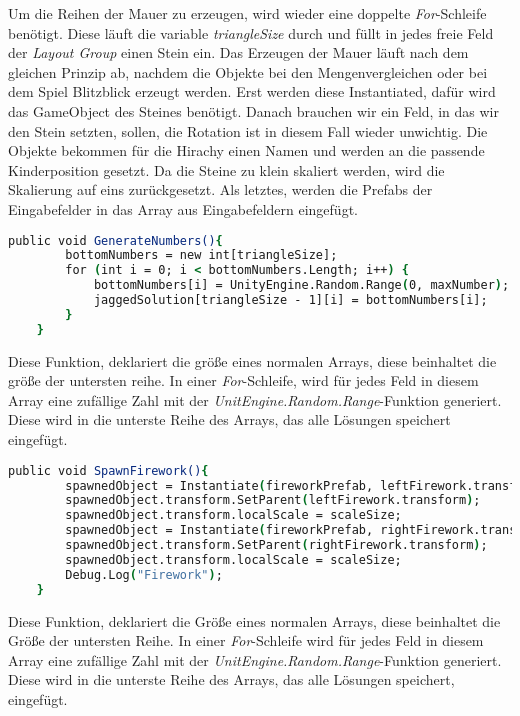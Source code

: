 Um die Reihen der Mauer zu erzeugen, wird wieder eine doppelte \textit{For}-Schleife benötigt. Diese läuft die variable \textit{triangleSize} durch und füllt in jedes freie Feld der \textit{Layout Group} einen Stein ein. Das Erzeugen der Mauer läuft nach dem gleichen Prinzip ab, nachdem die Objekte bei den Mengenvergleichen oder bei dem Spiel Blitzblick erzeugt werden. Erst werden diese Instantiated, dafür wird das GameObject des Steines benötigt. Danach brauchen wir ein Feld, in das wir den Stein setzten, sollen, die Rotation ist in diesem Fall wieder unwichtig. Die Objekte bekommen für die Hirachy einen Namen und werden an die passende Kinderposition gesetzt. Da die Steine zu klein skaliert werden, wird die Skalierung auf eins zurückgesetzt. Als letztes, werden die Prefabs der Eingabefelder in das Array aus Eingabefeldern eingefügt.\\
\begin{lstlisting}[language=csh, caption={Triangle.cs GenerateNumbers-Funktion}]
	public void GenerateNumbers(){
		bottomNumbers = new int[triangleSize];
		for (int i = 0; i < bottomNumbers.Length; i++) {
			bottomNumbers[i] = UnityEngine.Random.Range(0, maxNumber);
			jaggedSolution[triangleSize - 1][i] = bottomNumbers[i];
		}
	}
\end{lstlisting}
Diese Funktion, deklariert die größe eines normalen Arrays, diese beinhaltet die größe der untersten reihe. In einer \textit{For}-Schleife, wird für jedes Feld in diesem Array eine zufällige Zahl mit der \textit{UnitEngine.Random.Range}-Funktion generiert. Diese wird in die unterste Reihe des Arrays, das alle Lösungen speichert eingefügt.\\
\begin{lstlisting}[language=csh, caption={Triangle.cs SpawnFirework-Funktion}]
	public void SpawnFirework(){
		spawnedObject = Instantiate(fireworkPrefab, leftFirework.transform.position, leftFirework.transform.rotation);
		spawnedObject.transform.SetParent(leftFirework.transform);
		spawnedObject.transform.localScale = scaleSize;
		spawnedObject = Instantiate(fireworkPrefab, rightFirework.transform.position, rightFirework.transform.rotation);
		spawnedObject.transform.SetParent(rightFirework.transform);
		spawnedObject.transform.localScale = scaleSize;
		Debug.Log("Firework");
	}
\end{lstlisting}
Diese Funktion, deklariert die Größe eines normalen Arrays, diese beinhaltet die Größe der untersten Reihe. In einer \textit{For}-Schleife wird für jedes Feld in diesem Array eine zufällige Zahl mit der \textit{UnitEngine.Random.Range}-Funktion generiert. Diese wird in die unterste Reihe des Arrays, das alle Lösungen speichert, eingefügt.\\
